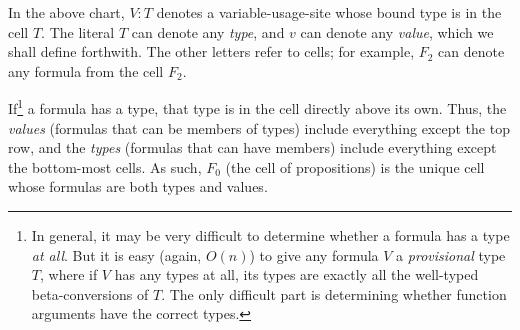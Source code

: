 \documentclass{article}
\begin{document}
  \vspace{0.5cm}

  In the above chart, $V:T$ denotes a variable-usage-site whose bound type is in the cell $T$. The literal $T$ can denote any \emph{type}, and $v$ can denote any \emph{value}, which we shall define forthwith. The other letters refer to cells; for example, $F_2$ can denote any formula from the cell $F_2$.

  If\footnote{In general, it may be very difficult to determine whether a formula has a type \emph{at all}. But it is easy (again, $O(n)$) to give any formula $V$ a \emph{provisional} type $T$, where if $V$ has any types at all, its types are exactly all the well-typed beta-conversions of $T$. The only difficult part is determining whether function arguments have the correct types.} a formula has a type, that type is in the cell directly above its own. Thus, the \emph{values} (formulas that can be members of types) include everything except the top row, and the \emph{types} (formulas that can have members) include everything except the bottom-most cells. As such, $F_0$ (the cell of propositions) is the unique cell whose formulas are both types and values.
\end{document}

